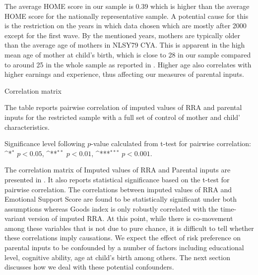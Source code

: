 \documentclass[emulatestandardclasses, 10pt, abstract = true]{scrartcl}
\begin{document}
The average HOME score in our sample is 0.39 which is higher than the average HOME score for the nationally representative sample. A potential cause for this is the restriction on the years in which data chosen which are mostly after 2000 except for the first wave. By the mentioned years, mothers are typically older than the average age of mothers in NLSY79 CYA. This is apparent in the high mean age of mother at child's birth, which is close to 28 in our sample compared to around 25 in the whole sample as reported in \citet{carneiro2016partial}. Higher age also correlates with higher earnings and experience, thus affecting our measures of parental inputs. 

\begin{sidewaystable}[!tbp]
	\def\sym#1{\ifmmode^{#1}\else\(^{#1}\)\fi}
	\setlength{\extrarowheight}{0.3em}
	\begin{threeparttable}
		\caption{Correlation matrix}
		
		\begin{tablenotes}[flushleft]\footnotesize
			\item The table reports pairwise correlation of imputed values of RRA and parental inputs for the restricted sample with a full set of control of mother and child' characteristics.
			\item Significance level following $p$-value calculated from t-test for pairwise correlation: \sym{*} \(p<0.05\), \sym{**} \(p<0.01\), \sym{***} \(p<0.001\).  
		\end{tablenotes}
		\label{table:correlation-matrix}
	\end{threeparttable}
\end{sidewaystable}

The correlation matrix of Imputed values of RRA and Parental inputs are presented in . It also reports statistical significance based on the t-test for pairwise correlation. The correlations between imputed values of RRA and Emotional Support Score are found to be statistically significant under both assumptions whereas Goods index is only robustly correlated with the time-variant version of imputed RRA. At this point, while there is co-movement among these variables that is not due to pure chance, it is difficult to tell whether these correlations imply causations. We expect the effect of risk preference on parental inputs to be confounded by a number of factors including educational level, cognitive ability, age at child's birth among others. The next section discusses how we deal with these potential confounders.   
\end{document}

